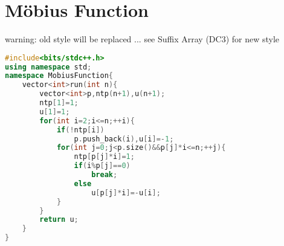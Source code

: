 \documentclass{book}
\begin{document}
\section{Möbius Function}
warning: old style will be replaced ... see Suffix Array (DC3) for new style\begin{lstlisting}[language=C++,title={Möbius Function.hpp (534 bytes, 21 lines)}]
#include<bits/stdc++.h>
using namespace std;
namespace MobiusFunction{
    vector<int>run(int n){
        vector<int>p,ntp(n+1),u(n+1);
        ntp[1]=1;
        u[1]=1;
        for(int i=2;i<=n;++i){
            if(!ntp[i])
                p.push_back(i),u[i]=-1;
            for(int j=0;j<p.size()&&p[j]*i<=n;++j){
                ntp[p[j]*i]=1;
                if(i%p[j]==0)
                    break;
                else
                    u[p[j]*i]=-u[i];
            }
        }
        return u;
    }
}
\end{lstlisting}
\end{document}

